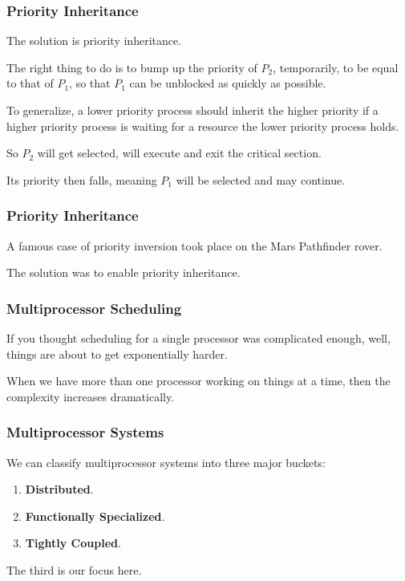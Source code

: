 \begin{frame}
\frametitle{Priority Inheritance}

The solution is \alert{priority inheritance}. 

The right thing to do is to bump up the priority of $P_{2}$, temporarily, to be equal to that of $P_{1}$, so that $P_{1}$ can be unblocked as quickly as possible. 

To generalize, a lower priority process should inherit the higher priority if a higher priority process is waiting for a resource the lower priority process holds. 

So $P_{2}$ will get selected, will execute and exit the critical section. 

Its priority then falls, meaning $P_{1}$ will be selected and may continue.

\end{frame}

\begin{frame}
\frametitle{Priority Inheritance}

A famous case of priority inversion took place on the Mars Pathfinder rover.

The solution was to enable priority inheritance.

\end{frame}

\begin{frame}
\frametitle{Multiprocessor Scheduling}

If you thought scheduling for a single processor was complicated enough, well, things are about to get exponentially harder. 

When we have more than one processor working on things at a time, then the complexity increases dramatically. 


\end{frame}

\begin{frame}
\frametitle{Multiprocessor Systems}

We can classify multiprocessor systems into three major buckets:

\begin{enumerate}
	\item \textbf{Distributed}.
	\item \textbf{Functionally Specialized}.
	\item \textbf{Tightly Coupled}.
\end{enumerate}

The third is our focus here.

\end{frame}

